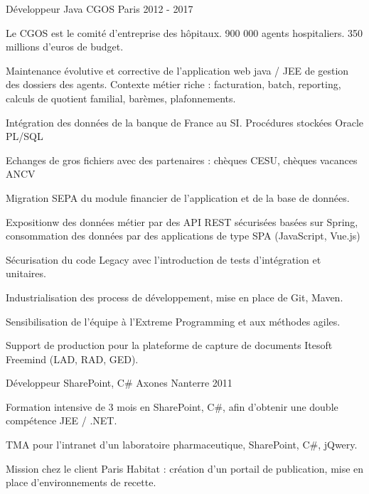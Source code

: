 \begin{cventries}
  \cventry
    {Développeur Java} %
    {CGOS} %
    {Paris} %
    {2012 - 2017} %
    {
      \begin{cvitems} %
        \item {Le CGOS est le comité d'entreprise des hôpitaux. 900 000 agents hospitaliers. 350 millions d'euros de budget.}
        \item {Maintenance évolutive et corrective de l’application web java / JEE de gestion des dossiers des agents. Contexte métier riche : facturation, batch, reporting, calculs de quotient familial, barèmes, plafonnements.}
        \item {Intégration des données de la banque de France au SI. Procédures stockées Oracle PL/SQL}
        \item {Echanges de gros fichiers avec des partenaires : chèques CESU, chèques vacances ANCV}
        \item {Migration SEPA du module financier de l’application et de la base de données.}
        \item {Expositionw des données métier par des API REST sécurisées basées sur Spring, consommation des données par des applications de type SPA (JavaScript, Vue.js)}
        \item {Sécurisation du code Legacy avec l’introduction de tests d’intégration et unitaires.}
        \item {Industrialisation des process de développement, mise en place de Git, Maven.}
        \item {Sensibilisation de l’équipe à l’Extreme Programming et aux méthodes agiles.}
        \item {Support de production pour la plateforme de capture de documents Itesoft Freemind (LAD, RAD, GED).}
      \end{cvitems}
    }

  \cventry
    {Développeur SharePoint, C\#} %
    {Axones} %
    {Nanterre} %
    {2011} %
    {
      \begin{cvitems} %
        \item {Formation intensive de 3 mois en SharePoint, C\#, afin d'obtenir une double compétence JEE / .NET.}
        \item {TMA pour l'intranet d'un laboratoire pharmaceutique, SharePoint, C\#, jQwery.}
        \item {Mission chez le client Paris Habitat : création d'un portail de publication, mise en place d'environnements de recette.}
      \end{cvitems}
    }


\end{cventries}
